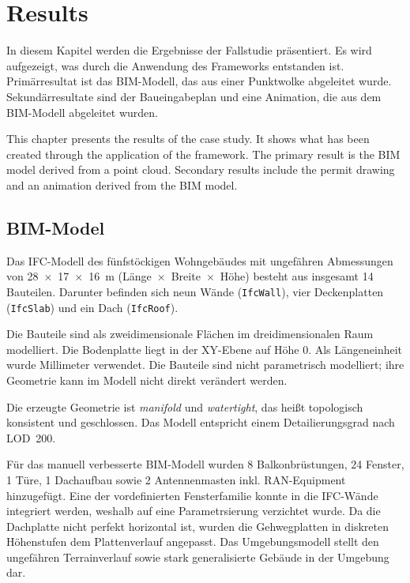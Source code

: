 \chapter{Results}
\label{sec:results}


\begin{German}
    In diesem Kapitel werden die Ergebnisse der Fallstudie präsentiert. Es wird aufgezeigt, was durch die Anwendung des Frameworks entstanden ist. Primärresultat ist das BIM-Modell, das aus einer Punktwolke abgeleitet wurde. Sekundärresultate sind der Baueingabeplan und eine Animation, die aus dem BIM-Modell abgeleitet wurden.
\end{German}

\begin{English}
    This chapter presents the results of the case study. It shows what has been created through the application of the framework. The primary result is the BIM model derived from a point cloud. Secondary results include the permit drawing and an animation derived from the BIM model.
\end{English}

\section{BIM-Model}
\begin{German}
    Das IFC-Modell des fünfstöckigen Wohngebäudes mit ungefähren Abmessungen von 28~$\times$~17~$\times$~16~m (Länge~$\times$~Breite~$\times$~Höhe) besteht aus insgesamt 14 Bauteilen. Darunter befinden sich neun Wände (\texttt{IfcWall}), vier Deckenplatten (\texttt{IfcSlab}) und ein Dach (\texttt{IfcRoof}).

    Die Bauteile sind als zweidimensionale Flächen im dreidimensionalen Raum modelliert. Die Bodenplatte liegt in der XY-Ebene auf Höhe 0. Als Längeneinheit wurde Millimeter verwendet. Die Bauteile sind nicht parametrisch modelliert; ihre Geometrie kann im Modell nicht direkt verändert werden.

    Die erzeugte Geometrie ist \emph{manifold} und \emph{watertight}, das heißt topologisch konsistent und geschlossen. Das Modell entspricht einem Detailierungsgrad nach LOD~200.

    Für das manuell verbesserte BIM-Modell wurden 8 Balkonbrüstungen, 24 Fenster, 1 Türe, 1 Dachaufbau sowie 2 Antennenmasten inkl. RAN-Equipment hinzugefügt. Eine der vordefinierten Fensterfamilie konnte in die IFC-Wände integriert werden, weshalb auf eine Parametrsierung verzichtet wurde. Da die Dachplatte nicht perfekt horizontal ist, wurden die Gehwegplatten in diskreten Höhenstufen dem Plattenverlauf angepasst. Das Umgebungsmodell stellt den ungefähren Terrainverlauf sowie stark generalisierte Gebäude in der Umgebung dar.
\end{German}

